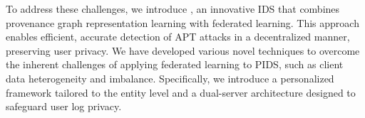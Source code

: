 To address these challenges, we introduce \Sys, an innovative IDS that combines provenance graph representation learning with federated learning. This approach enables efficient, accurate detection of APT attacks in a decentralized manner, preserving user privacy. We have developed various novel techniques to overcome the inherent challenges of applying federated learning to PIDS, such as client data heterogeneity and imbalance. Specifically, we introduce a personalized \gnnshort framework tailored to the entity level and a dual-server architecture designed to safeguard user log privacy.